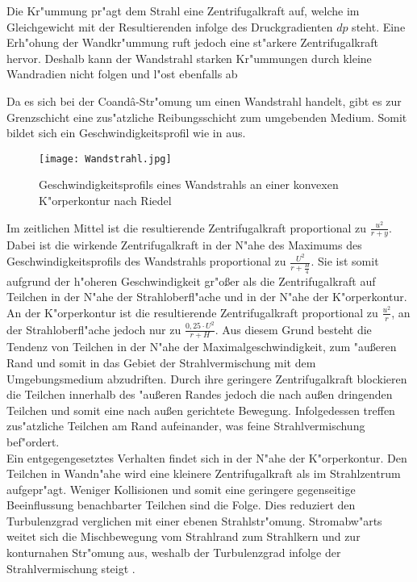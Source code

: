 Die Kr"ummung pr"agt dem Strahl eine Zentrifugalkraft auf, welche im Gleichgewicht mit der Resultierenden infolge des Druckgradienten $dp$ steht. Eine Erh"ohung der Wandkr"ummung ruft jedoch eine st"arkere Zentrifugalkraft hervor. Deshalb kann der Wandstrahl starken Kr"ummungen durch kleine Wandradien nicht folgen und l"ost ebenfalls ab \cite{Riedel.1971}

Da es sich bei der Coand\^{a}-Str"omung um einen Wandstrahl handelt, gibt es zur Grenzschicht eine zus"atzliche Reibungsschicht zum umgebenden Medium. Somit bildet sich ein Geschwindigkeitsprofil wie in  aus. \\

\begin{figure}[h]
	\centering
	\texttt{[image: Wandstrahl.jpg]}
	\caption{Geschwindigkeitsprofils eines Wandstrahls an einer konvexen K"orperkontur nach Riedel \cite{Riedel.1973}}
	\label{fig:Wandstrahl}
\end{figure}

Im zeitlichen Mittel ist die resultierende Zentrifugalkraft proportional zu $\frac{u^2}{r+y}$. Dabei ist die wirkende Zentrifugalkraft in der N"ahe des Maximums des Geschwindigkeitsprofils des Wandstrahls proportional zu $\frac{U^2}{r+\frac{H}{4}}$. Sie ist somit aufgrund der h"oheren Geschwindigkeit gr"o\ss{}er als die Zentrifugalkraft auf Teilchen in der N"ahe der Strahloberfl"ache und in der N"ahe der K"orperkontur.\\
An der K"orperkontur ist die resultierende Zentrifugalkraft proportional zu $\frac{u^2}{r}$, an der Strahloberfl"ache jedoch nur zu $\frac{0,25 \cdot U^2}{r + H}$. Aus diesem Grund besteht die Tendenz von Teilchen in der N"ahe der Maximalgeschwindigkeit, zum "au\ss{}eren Rand und somit in das Gebiet der Strahlvermischung mit dem Umgebungsmedium abzudriften. Durch ihre geringere Zentrifugalkraft blockieren die Teilchen innerhalb des "au\ss{}eren Randes jedoch die nach au\ss{}en dringenden Teilchen und somit eine nach au\ss{}en gerichtete Bewegung. Infolgedessen treffen zus"atzliche Teilchen am Rand aufeinander, was feine Strahlvermischung bef"ordert.\\
Ein entgegengesetztes Verhalten findet sich in der N"ahe der K"orperkontur. Den Teilchen in Wandn"ahe wird eine kleinere Zentrifugalkraft als im Strahlzentrum aufgepr"agt. Weniger Kollisionen und somit eine geringere gegenseitige Beeinflussung benachbarter Teilchen sind die Folge. Dies reduziert den Turbulenzgrad verglichen mit einer ebenen Strahlstr"omung.
Stromabw"arts weitet sich die Mischbewegung vom Strahlrand zum Strahlkern und zur konturnahen Str"omung aus, weshalb der Turbulenzgrad infolge der Strahlvermischung steigt \cite{Riedel.1973}. 

